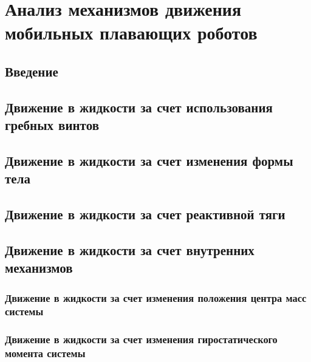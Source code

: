 \chapter{Анализ механизмов движения мобильных плавающих роботов}\label{ch:ch1}

\section{Введение}\label{sec:ch1/sec1}



\section{Движение в жидкости за счет использования гребных винтов}\label{sec:ch1/sec2}


\section{Движение в жидкости за счет изменения формы тела}\label{sec:ch1/sec3}


\section{Движение в жидкости за счет реактивной тяги}\label{sec:ch1/sec4}



\section{Движение в жидкости за счет внутренних механизмов}\label{sec:ch1/sec5}



\subsection{Движение в жидкости за счет изменения положения центра масс системы}\label{subsec:ch1/sec5/sub1}


\subsection{Движение в жидкости за счет изменения гиростатического момента системы}\label{subsec:ch1/sec5/sub2}




